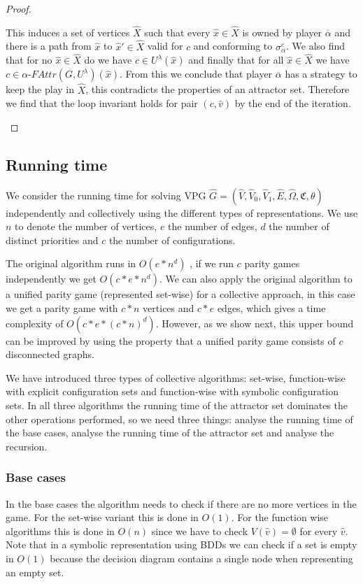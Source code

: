 \begin{theorem}
\begin{proof}
\begin{itemize}[\ \ ]
			This induces a set of vertices $\hat{X}$ such that every $\hat{x} \in \hat{X}$ is owned by player $\overline{\alpha}$ and there is a path from $\hat{x}$ to $\hat{x}'\in \hat{X}$ valid for $c$ and conforming to $\sigma_\alpha^c$. We also find that for no $\hat{x} \in \hat{X}$ do we have $c \in U^\lambda(\hat{x})$ and finally that for all $\hat{x} \in \hat{X}$ we have $c \in \alpha\textit{-FAttr}(G,U^\lambda)(\hat{x})$. From this we conclude that player $\overline{\alpha}$ has a strategy to keep the play in $\hat{X}$, this contradicts the properties of an attractor set. Therefore we find that the loop invariant holds for pair $(c,\hat{v})$ by the end of the iteration.
		\end{itemize}		
	\end{proof}
\end{theorem}

\subsection{Running time}
We consider the running time for solving VPG $\hat{G} = (\hat{V},\hat{V}_0,\hat{V}_1,\hat{E},\hat{\Omega},\mathfrak{C},\theta)$ independently and collectively using the different types of representations. We use $n$ to denote the number of vertices, $e$ the number of edges, $d$ the number of distinct priorities and $c$ the number of configurations.

The original algorithm runs in $O(e * n^d)$ \cite{friedmanPG}, if we run $c$ parity games independently we get $O(c * e * n ^d)$. We can also apply the original algorithm to a unified parity game (represented set-wise) for a collective approach, in this case we get a parity game with $c*n$ vertices and $c*e$ edges, which gives a time complexity of $O(c*e*(c*n)^d)$. However, as we show next, this upper bound can be improved by using the property that a unified parity game consists of $c$ disconnected graphs.

We have introduced three types of collective algorithms: set-wise, function-wise with explicit configuration sets and function-wise with symbolic configuration sets. In all three algorithms the running time of the attractor set dominates the other operations performed, so we need three things: analyse the running time of the base cases, analyse the running time of the attractor set and analyse the recursion.

\subsubsection{Base cases} In the base cases the algorithm needs to check if there are no more vertices in the game. For the set-wise variant this is done in $O(1)$. For the function wise algorithms this is done in $O(n)$ since we have to check $V(\hat{v}) = \emptyset$ for every $\hat{v}$. Note that in a symbolic representation using BDDs we can check if a set is empty in $O(1)$ because the decision diagram contains a single node when representing an empty set.

